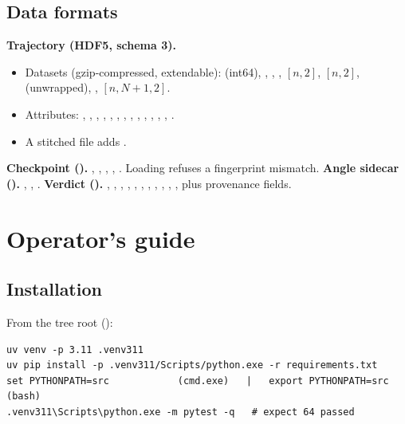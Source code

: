 \subsection{Data formats}\label{sec:formats}
\textbf{Trajectory (HDF5, schema 3).}
\begin{itemize}
\item Datasets (gzip-compressed, extendable):  (int64), , , , $[n,2]$, $[n,2]$,  (unwrapped), , $[n,N+1,2]$.
\item Attributes: , , , , , , , , , , , , , .
\item A stitched file adds .
\end{itemize}
\textbf{Checkpoint ().} , , , , . Loading refuses a fingerprint mismatch.
\textbf{Angle sidecar ().} , , .
\textbf{Verdict ().} , , , , , , , , , , , plus provenance fields.

\section{Operator's guide}\label{sec:ops}
\subsection{Installation}
From the tree root ():
\begin{lstlisting}[style=sh]
uv venv -p 3.11 .venv311
uv pip install -p .venv311/Scripts/python.exe -r requirements.txt
set PYTHONPATH=src            (cmd.exe)   |   export PYTHONPATH=src   (bash)
.venv311\Scripts\python.exe -m pytest -q   # expect 64 passed
\end{lstlisting}

